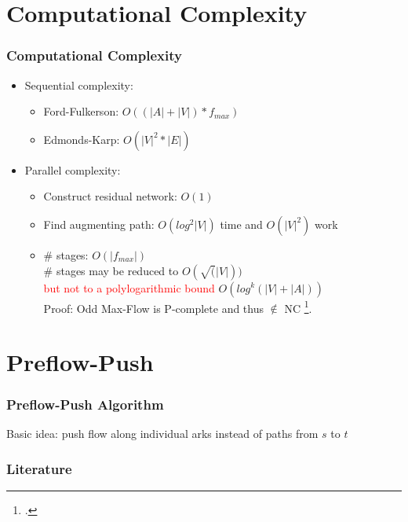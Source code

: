 \documentclass{beamer}
\begin{document}
\section{Computational Complexity}
\begin{frame}
	\frametitle{Computational Complexity}
	\begin{itemize}
		\item Sequential complexity:
		\begin{itemize}
			\item Ford-Fulkerson: $O((|A|+|V|)*f_{max})$
			\item Edmonds-Karp: $O(|V|^{2} * |E|) $
		\end{itemize}
		\pause
		\item Parallel complexity:
		\begin{itemize}
			\item Construct residual network: $O(1)$
			\item Find augmenting path: $O(log^{2}|V|)$ time and $O(|V|^{2})$ work
			\item \# stages: $O(|f_{max}|)$\\
				\# stages may be reduced to $O(\sqrt(|V|))$\\
			  	\textcolor{red}{but not to a polylogarithmic bound} $O(log^{k}(|V| + |A|))$\\
			  	Proof: Odd Max-Flow is P-complete and  thus $\notin$ NC
			  	\footcite{papa95}.
		\end{itemize}			
	\end{itemize}
\end{frame}

\section{Preflow-Push}
\begin{frame}
	\frametitle{Preflow-Push Algorithm}
	Basic idea: push flow along individual arks instead of paths from $s$ to $t$
	
\end{frame} 
 	 
\begin{frame}[allowframebreaks]
\frametitle<presentation>{Literature}    
\printbibliography
\end{frame} 	 
 	 
\end{document}
